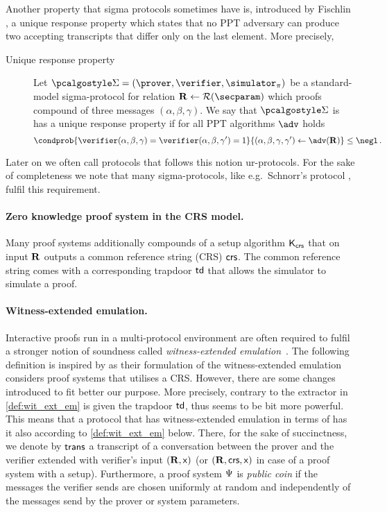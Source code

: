 \documentclass[runningheads,11pt]{llncs}
\theoremstyle{definition}
\begin{document}
Another property that sigma protocols sometimes have is, introduced by Fischlin \cite{C:Fischlin05}, a unique response property which states that no PPT adversary  can produce two accepting transcripts that differ only on the last element.
More precisely,
\begin{description}
	\item[Unique response property] Let $\sigmaprot = (\prover, \verifier, \simulator_\zkproof)$ be a standard-model sigma-protocol for relation $\REL \gets \RELGEN(\secparam)$ which proofs compound of three messages $(\alpha, \beta, \gamma)$. We say that $\sigmaprot$ is has a unique response property if for all PPT algorithms $\adv$ holds
	\[
	\condprob{\verifier (\alpha, \beta, \gamma) = \verifier (\alpha, \beta, \gamma')  = 1}{(\alpha, \beta, \gamma, \gamma') \gets \adv(\REL)} \leq \negl\,.
	\]
\end{description}
Later on we often call protocols that follows this notion ur-protocols.
For the sake of completeness we note that many sigma-protocols, like e.g.~Schnorr's protocol \cite{C:Schnorr89}, fulfil this requirement.

\paragraph{Zero knowledge proof system in the CRS model.}
Many proof systems additionally compounds of a setup algorithm $\mathsf{K}_{\mathsf{crs}}$ that on input $\mathbf{R}$ outputs a common reference string (CRS) $\mathsf{crs}$. The common reference string comes with a corresponding trapdoor $\mathsf{td}$ that allows the simulator to simulate a proof.

\paragraph{Witness-extended emulation.}
Interactive proofs run in a multi-protocol environment are often required to fulfil a stronger notion of soundness called \emph{witness-extended emulation}~\cite{JC:Lindell03}.
The following definition is inspired by  \cite{EC:GroIsh08} as their formulation of the witness-extended emulation considers proof systems that utilises a CRS. However, there are some changes introduced to fit better our purpose. More precisely, contrary to \cite{EC:GroIsh08,EC:BCCGP16} the extractor in \cref{def:wit_ext_em} is given the trapdoor $\mathsf{td}$, thus seems to be bit more powerful.
This means that a protocol that has witness-extended emulation in terms of \cite{EC:GroIsh08} has it also according to \cref{def:wit_ext_em} below.
There, for the sake of succinctness, we denote by $\mathsf{trans}$ a transcript of a conversation between the prover and the verifier extended with verifier's input $(\mathbf{R}, \mathsf{x})$ (or $(\mathbf{R}, \mathsf{crs}, \mathsf{x})$ in case of a proof system with a setup).
Furthermore, a proof system $\mathrm{\Psi}$ is \emph{public coin} if the messages the verifier sends are chosen uniformly at random and independently of the messages send by the prover or system parameters.
\end{document}
